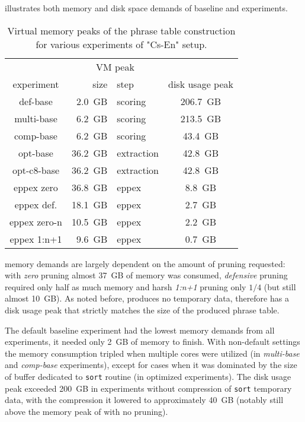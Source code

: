  illustrates both memory and disk space demands of baseline
and \eppex{} experiments.

\begin{table}[ht]
\centering
\begin{tabular}{ | c | r l | c | }
\hline
 & \multicolumn{2}{|c|}{VM peak} & \\
experiment & size & step & disk usage peak \\
\hline
\hline
def-base       &  2.0~GB &    scoring & 206.7~GB \\
multi-base     &  6.2~GB &    scoring & 213.5~GB \\
comp-base      &  6.2~GB &    scoring &  43.4~GB \\
opt-base       & 36.2~GB & extraction &  42.8~GB \\
opt-c8-base    & 36.2~GB & extraction &  42.8~GB \\
eppex zero     & 36.8~GB &      eppex &   8.8~GB \\
\hline
eppex def.     & 18.1~GB &      eppex &   2.7~GB \\
eppex zero-n   & 10.5~GB &      eppex &   2.2~GB \\
eppex 1:n+1    &  9.6~GB &      eppex &   0.7~GB \\
\hline
\end{tabular}
\caption{\label{cs-en-wmt13-vm-and-disk-usage-peaks}
Virtual memory peaks of the phrase table construction for various experiments of "Cs-En" setup.}
\end{table}

\Eppex{} memory demands are largely dependent on the amount of pruning requested: with \emph{zero}
pruning almost 37~GB of memory was consumed, \emph{defensive} pruning required only half as much
memory and harsh \emph{1:n+1} pruning only $1/4$ (but still almost 10~GB).
As noted before, \eppex{} produces no temporary data, therefore has a disk usage peak that strictly
matches the size of the produced phrase table.

The default baseline experiment had the lowest memory demands from all experiments, it needed only 2~GB
of memory to finish.
With non-default settings the memory consumption tripled when multiple cores were utilized (in \emph{multi-base}
and \emph{comp-base} experiments), except for cases when it was dominated by the size of buffer dedicated
to \texttt{sort} routine (in optimized experiments).
The disk usage peak exceeded 200~GB in experiments without compression of \texttt{sort} temporary data,
with the compression it lowered to approximately 40~GB (notably still above the memory peak of \eppex{}
with no pruning).

